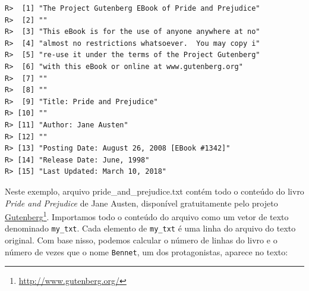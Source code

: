 \documentclass[
  11pt,
]{book}
\begin{document}
\begin{verbatim}
R>  [1] "The Project Gutenberg EBook of Pride and Prejudice"
R>  [2] ""                                                  
R>  [3] "This eBook is for the use of anyone anywhere at no"
R>  [4] "almost no restrictions whatsoever.  You may copy i"
R>  [5] "re-use it under the terms of the Project Gutenberg"
R>  [6] "with this eBook or online at www.gutenberg.org"    
R>  [7] ""                                                  
R>  [8] ""                                                  
R>  [9] "Title: Pride and Prejudice"                        
R> [10] ""                                                  
R> [11] "Author: Jane Austen"                               
R> [12] ""                                                  
R> [13] "Posting Date: August 26, 2008 [EBook #1342]"       
R> [14] "Release Date: June, 1998"                          
R> [15] "Last Updated: March 10, 2018"
\end{verbatim}

Neste exemplo, arquivo pride\_and\_prejudice.txt contém todo o conteúdo do livro \emph{Pride and Prejudice} de Jane Austen, disponível gratuitamente pelo projeto \href{http://www.gutenberg.org/}{Gutenberg}\footnote{\url{http://www.gutenberg.org/}}. Importamos todo o conteúdo do arquivo como um vetor de texto denominado \texttt{my\_txt}. Cada elemento de \texttt{my\_txt} é uma linha do arquivo do texto original. Com base nisso, podemos calcular o número de linhas do livro e o número de vezes que o nome \texttt{\textquotesingle{}Bennet\textquotesingle{}}, um dos protagonistas, aparece no texto:
\end{document}
